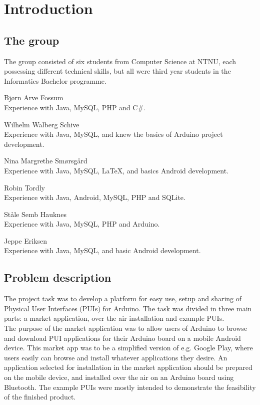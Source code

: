 \chapter{Introduction}
\section{The group}
The group consisted of six students from Computer Science at NTNU, each possessing different technical skills, but all were third year students in the Informatics Bachelor programme.

\begin{description}
\item{Bjørn Arve Fossum}\hfill \\
	Experience with Java, MySQL, PHP and C\#.
\item{Wilhelm Walberg Schive}\hfill \\
	Experience with Java, MySQL, and knew the basics of Arduino project development.
\item{Nina Margrethe Smørsgård}\hfill \\
	Experience with Java, MySQL, \LaTeX, and basics Android development.
\item{Robin Tordly}\hfill \\
	Experience with Java, Android, MySQL, PHP and SQLite. 
\item{Ståle Semb Hauknes}\hfill \\
	Experience with Java, MySQL, PHP and Arduino.
\item{Jeppe Eriksen}\hfill \\
	Experience with Java, MySQL, and basic Android development.  
\end{description}

\section{Problem description}
The project task was to develop a platform for easy use, setup and sharing of Physical User Interfaces (PUIs) for Arduino. The task was divided in three main parts: a market application, over the air installation and example PUIs.\\
\newline
The purpose of the market application was to allow users of Arduino to browse and download PUI applications for their Arduino board on a mobile Android device. This market app was to be a simplified version of e.g. Google Play, where users easily can browse and install whatever applications they desire. An application selected for installation in the market application should be prepared on the mobile device, and installed over the air on an Arduino board using Bluetooth. The example PUIs were mostly intended to demonstrate the feasibility of the finished product.

